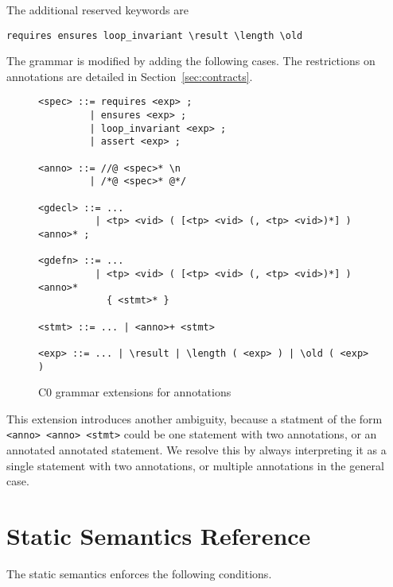 \documentclass[11pt]{article}
\begin{document}
The additional reserved keywords are
\begin{verbatim}
requires ensures loop_invariant \result \length \old
\end{verbatim}
The grammar is modified by adding the following cases.  The
restrictions on annotations are detailed in
Section~\ref{sec:contracts}.

\begin{figure}
\begin{small}
\begin{verbatim}
<spec> ::= requires <exp> ;
         | ensures <exp> ;
         | loop_invariant <exp> ;
         | assert <exp> ;

<anno> ::= //@ <spec>* \n
         | /*@ <spec>* @*/

<gdecl> ::= ...
          | <tp> <vid> ( [<tp> <vid> (, <tp> <vid>)*] ) <anno>* ;

<gdefn> ::= ...
          | <tp> <vid> ( [<tp> <vid> (, <tp> <vid>)*] ) <anno>*
            { <stmt>* }

<stmt> ::= ... | <anno>+ <stmt>

<exp> ::= ... | \result | \length ( <exp> ) | \old ( <exp> )
\end{verbatim}
\end{small}
\caption{C0 grammar extensions for annotations}
\end{figure}

This extension introduces another ambiguity, because a statment of the
form \verb'<anno> <anno> <stmt>' could be one statement with two
annotations, or an annotated annotated statement.  We resolve this by
always interpreting it as a single statement with two annotations, or
multiple annotations in the general case.

\section{Static Semantics Reference}

The static semantics enforces the following conditions.
\end{document}
